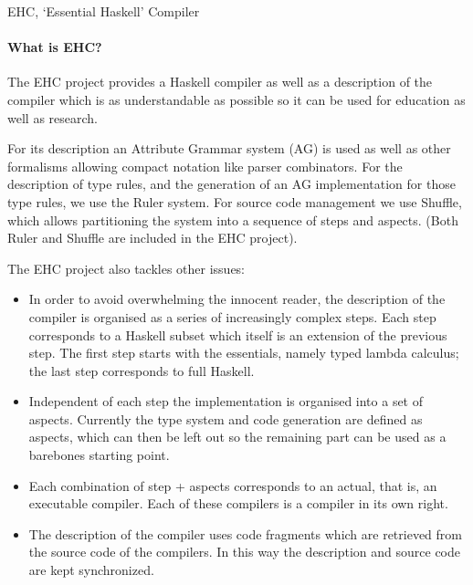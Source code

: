 \documentclass{article}
\begin{document}
\begin{hcarentry}{EHC, `Essential Haskell' Compiler}
\label{ehc}
\makeheader

\paragraph{What is EHC?}
The EHC project provides a Haskell compiler as well as a description of the
compiler which is as understandable as possible so it can be used for
education as well as research.

For its description an Attribute Grammar system (AG) is used as well as other
formalisms allowing compact notation like parser combinators.  For the
description of type rules, and the generation of an AG implementation for
those type rules, we use the Ruler system.
For source code management we use Shuffle, which allows partitioning the system into a sequence of steps and aspects.
(Both Ruler and Shuffle are included in the EHC project).

The EHC project also tackles other issues:
\begin{itemize}
\item
   In order to avoid overwhelming the innocent reader,
   the description of the compiler is organised as a series of
   increasingly complex steps.
   Each step corresponds to a Haskell subset which itself is an extension
   of the previous step.
   The first step starts with the essentials, namely typed lambda
   calculus; the last step corresponds to full Haskell.

\item
   Independent of each step the implementation is organised into a set of aspects.
   Currently the type system and code generation are defined as aspects,
   which can then be left out so the remaining part can be used as a barebones starting point.

\item
   Each combination of step + aspects corresponds to an actual, that is, an executable compiler.
   Each of these compilers is a compiler in its own right.

\item
   The description of the compiler uses code fragments which are
   retrieved from the source code of the compilers.
   In this way the description and source code are kept synchronized.
\end{itemize}


\end{hcarentry}
\end{document}
